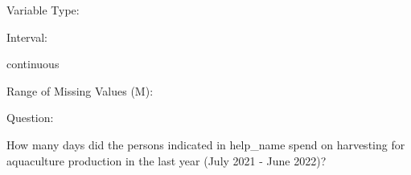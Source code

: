 \documentclass[
]{article}
\begin{document}
\begin{minipage}[t]{0.3\linewidth}

Variable Type:

\end{minipage}%
\begin{minipage}[t]{0.7\linewidth}

\end{minipage}

\begin{minipage}[t]{0.3\linewidth}

Interval:

\end{minipage}%
\begin{minipage}[t]{0.7\linewidth}

continuous

\end{minipage}

\begin{minipage}[t]{0.3\linewidth}

Range of Missing Values (M):

\end{minipage}%
\begin{minipage}[t]{0.7\linewidth}

\end{minipage}

\begin{minipage}[t]{0.3\linewidth}

Question:

\end{minipage}%
\begin{minipage}[t]{0.7\linewidth}

How many days did the persons indicated in help\_name spend on
harvesting for aquaculture production in the last year (July 2021 - June
2022)?

\end{minipage}

\begin{minipage}[t]{0.3\linewidth}

~

\end{minipage}%
\begin{minipage}[t]{0.7\linewidth}

~

\end{minipage}
 \vspace*{-6mm} 

\begin{minipage}[t]{0.3\linewidth}

~

\end{minipage}%
\begin{minipage}[t]{0.7\linewidth}

~

\end{minipage}
 \vspace*{-4mm} 
\end{document}
